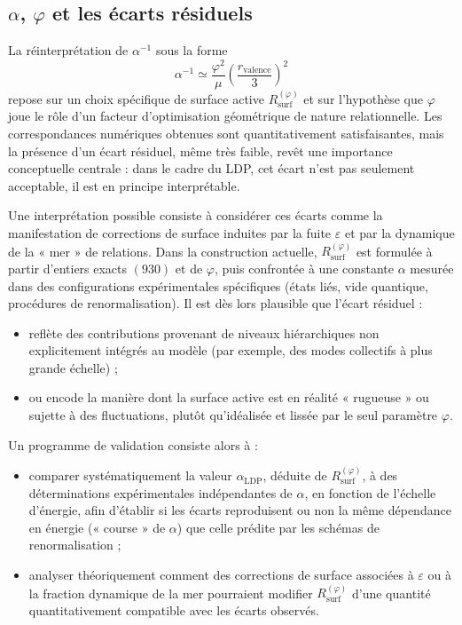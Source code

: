 \documentclass[11pt,a4paper]{article}
\begin{document}
\subsection{\texorpdfstring{\(\alpha\), \(\varphi\)}{alpha, phi} et les écarts résiduels}

La réinterprétation de \(\alpha^{-1}\) sous la forme
\[
\alpha^{-1} \simeq \frac{\varphi^{2}}{\mu}\left(\frac{r_{\mathrm{valence}}}{3}\right)^{2}
\]
repose sur un choix spécifique de surface active \(R_{\mathrm{surf}}^{\left(\varphi\right)}\) et sur l’hypothèse que \(\varphi\) joue le rôle d’un facteur d’optimisation géométrique de nature relationnelle. Les correspondances numériques obtenues sont quantitativement satisfaisantes, mais la présence d’un écart résiduel, même très faible, revêt une importance conceptuelle centrale : dans le cadre du LDP, cet écart n’est pas seulement acceptable, il est en principe interprétable.

Une interprétation possible consiste à considérer ces écarts comme la manifestation de corrections de surface induites par la fuite \(\varepsilon\) et par la dynamique de la « mer » de relations. Dans la construction actuelle, \(R_{\mathrm{surf}}^{\left(\varphi\right)}\) est formulée à partir d’entiers exacts \(\left(930\right)\) et de \(\varphi\), puis confrontée à une constante \(\alpha\) mesurée dans des configurations expérimentales spécifiques (états liés, vide quantique, procédures de renormalisation). Il est dès lors plausible que l’écart résiduel :
\begin{itemize}
  \item reflète des contributions provenant de niveaux hiérarchiques non explicitement intégrés au modèle (par exemple, des modes collectifs à plus grande échelle) ; 
  \item ou encode la manière dont la surface active est en réalité « rugueuse » ou sujette à des fluctuations, plutôt qu’idéalisée et lissée par le seul paramètre \(\varphi\).
\end{itemize}

Un programme de validation consiste alors à :
\begin{itemize}
  \item comparer systématiquement la valeur \(\alpha_{\mathrm{LDP}}\), déduite de \(R_{\mathrm{surf}}^{\left(\varphi\right)}\), à des déterminations expérimentales indépendantes de \(\alpha\), en fonction de l’échelle d’énergie, afin d’établir si les écarts reproduisent ou non la même dépendance en énergie (« course » de \(\alpha\)) que celle prédite par les schémas de renormalisation ; 
  \item analyser théoriquement comment des corrections de surface associées à \(\varepsilon\) ou à la fraction dynamique de la mer pourraient modifier \(R_{\mathrm{surf}}^{\left(\varphi\right)}\) d’une quantité quantitativement compatible avec les écarts observés.
\end{itemize}
\end{document}
